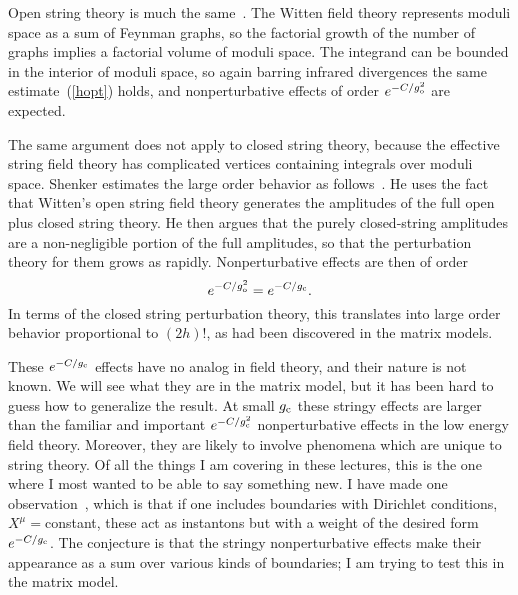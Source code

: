Open string theory is much the same~\cite{GPer}.  The Witten field
theory represents moduli space as a sum of Feynman graphs, so the
factorial growth of the number of graphs implies a factorial volume
of moduli space.  The integrand can be bounded in the interior of
moduli space, so again barring infrared divergences the same
estimate~(\ref{hopt}) holds, and nonperturbative effects of order
$e^{-C/g_{\rm o}^2}$ are expected.

The same argument does not apply to closed string theory, because the
effective string field theory has complicated vertices containing 
integrals over moduli space.  Shenker estimates the large order
behavior as follows~\cite{Slo}.  He uses the fact that Witten's open
string field theory generates the amplitudes of the full open plus
closed string theory.   He then argues that the purely closed-string
amplitudes are a non-negligible portion of the full amplitudes,
so that the perturbation theory for them grows as rapidly.
Nonperturbative effects are then of order
\begin{equation}
e^{-C/g_{\rm o}^2} = e^{-C/g_{\rm c}}.
\end{equation}
In terms of the closed string perturbation theory, this translates
into large order behavior proportional to $(2h)!$, as had been
discovered in the matrix models.

These $e^{-C/g_{\rm c}}$ effects have no analog in field theory, and
their nature is not known.  We will see what they are in the matrix
model, but it has been hard to guess how to generalize the result.
At small $g_{\rm c}$ these stringy effects are larger than the familiar and
important $e^{-C/g_{\rm c}^2}$ nonperturbative effects in
the low energy field theory. 
Moreover, they are likely to involve phenomena which are unique to
string theory.  Of all the things I am covering in these lectures, this
is the one where I most wanted to be able to say something new.
I have made one observation~\cite{Pdir}, which is that if one
includes boundaries with Dirichlet conditions, $X^\mu =$constant,
these act as instantons but with a weight of the desired form
$e^{-C/g_{\rm c}}$. The conjecture
is that the stringy nonperturbative effects make their appearance as a
sum over various kinds of boundaries; I am trying to test this in the
matrix model.

